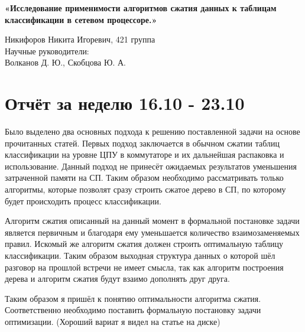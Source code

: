 \documentclass[a4peper, 12pt, titlepage, finall]{extreport}
\begin{document}
\begin{center}
    {\large \bf «Исследование применимости алгоритмов сжатия данных к таблицам классификации в сетевом процессоре.»}

\end{center}
        \begin{flushright}
            {Никифоров Никита Игоревич, 421 группа}\\
            {Научные руководители:\\ Волканов Д. Ю., Скобцова Ю. А.}
        \end{flushright}
    \section{Отчёт за неделю 16.10 - 23.10}
        Было выделено два основных подхода к решению поставленной задачи на основе прочитанных статей.
        Первых подход заключается в обычном сжатии таблиц классификации на уровне ЦПУ в коммутаторе и их дальнейшая распаковка
        и использование. Данный подход не принесёт ожидаемых результатов уменьшения затраченной памяти на СП.
        Таким образом необходимо рассматривать только алгоритмы, которые позволят сразу строить сжатое дерево в СП,
        по которому будет происходить процесс классификации.

        Алгоритм сжатия описанный на данный момент в формальной постановке задачи является первичным и благодаря ему уменьшается
        количество взаимозаменяемых правил. Искомый же алгоритм сжатия должен строить оптимальную таблицу классификации.
        Таким образом выходная структура данных о которой шёл разговор на прошлой встречи не имеет смысла, так как алгоритм построения
        дерева и алгоритм сжатия будут взаимо дополнять друг друга.

        Таким образом я пришёл к понятию оптимальности алгоритма сжатия. Соответственно необходимо поставить формальную постановку 
        задачи оптимизации. (Хороший вариат я видел на статье на диске)
\end{document}
